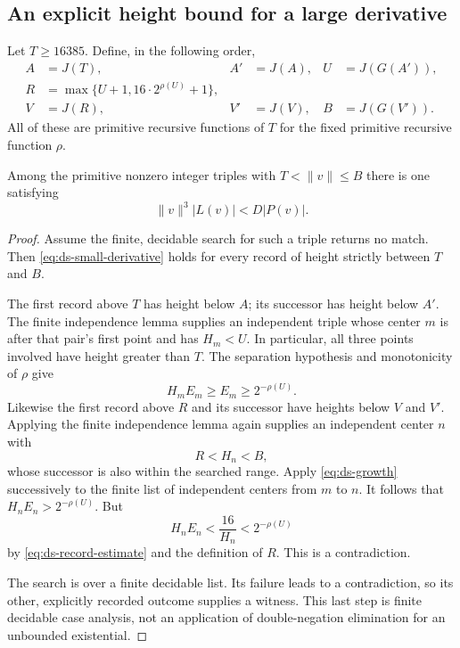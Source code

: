 \subsection{An explicit height bound for a large derivative}

Let $T\geq16385$.  Define, in the following order,
\begin{equation}\label{eq:ds-final-bound}
\begin{aligned}
 A&=J(T),& A'&=J(A),& U&=J(G(A')),\\
 R&=\max\{U+1,16\cdot2^{\rho(U)}+1\},\\
 V&=J(R),& V'&=J(V),& B&=J(G(V')).
\end{aligned}
\end{equation}
All of these are primitive recursive functions of $T$ for the fixed
primitive recursive function $\rho$.

\begin{lemma}\label{lem:ds-large-derivative}
Among the primitive nonzero integer triples with $T<\|v\|\leq B$ there is
one satisfying
\begin{equation}\label{eq:ds-large-derivative}
 \|v\|^3|L(v)|<D|P(v)|.
\end{equation}
\end{lemma}

\begin{proof}
Assume the finite, decidable search for such a triple returns no match.
Then \eqref{eq:ds-small-derivative} holds for every record of height
strictly between $T$ and $B$.

The first record above $T$ has height below $A$; its successor has height
below $A'$.  The finite independence lemma supplies an independent triple
whose center $m$ is after that pair's first point and has $H_m<U$.
In particular, all three points involved have height greater than $T$.
The separation hypothesis and monotonicity of $\rho$ give
\[
 H_mE_m\geq E_m\geq2^{-\rho(U)}.
\]
Likewise the first record above $R$ and its successor have heights below
$V$ and $V'$.  Applying the finite independence lemma again supplies an
independent center $n$ with
\[
 R<H_n<B,
\]
whose successor is also within the searched range.  Apply
\eqref{eq:ds-growth} successively to the finite list of independent
centers from $m$ to $n$.  It follows that
$H_nE_n>2^{-\rho(U)}$.  But
\[
 H_nE_n<\frac{16}{H_n}
 <2^{-\rho(U)}
\]
by \eqref{eq:ds-record-estimate} and the definition of $R$.  This is a
contradiction.

The search is over a finite decidable list.  Its failure leads to a
contradiction, so its other, explicitly recorded outcome supplies a
witness.  This last step is finite decidable case analysis, not an
application of double-negation elimination for an unbounded existential.
\end{proof}

